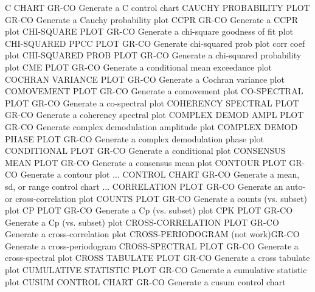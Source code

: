 C CHART                     GR-CO Generate a C control chart
CAUCHY PROBABILITY PLOT     GR-CO Generate a Cauchy probability plot
CCPR                        GR-CO Generate a CCPR plot 
CHI-SQUARE PLOT             GR-CO Generate a chi-square goodness of fit plot
CHI-SQUARED PPCC PLOT       GR-CO Generate chi-squared prob plot corr coef plot
CHI-SQUARED PROB PLOT       GR-CO Generate a chi-squared probability plot
CME PLOT                    GR-CO Generate a conditional mean exceedance plot
COCHRAN VARIANCE PLOT       GR-CO Generate a Cochran variance plot
COMOVEMENT PLOT             GR-CO Generate a comovement plot
CO-SPECTRAL PLOT            GR-CO Generate a co-spectral plot
COHERENCY SPECTRAL PLOT     GR-CO Generate a coherency spectral plot
COMPLEX DEMOD AMPL PLOT     GR-CO Generate complex demodulation amplitude plot
COMPLEX DEMOD PHASE PLOT    GR-CO Generate a complex demodulation phase plot
CONDITIONAL PLOT            GR-CO Generate a conditional plot
CONSENSUS MEAN PLOT         GR-CO Generate a consensus mean plot
CONTOUR PLOT                GR-CO Generate a contour plot
... CONTROL CHART           GR-CO Generate a mean, sd, or range control chart
... CORRELATION PLOT        GR-CO Generate an auto- or cross-correlation plot
COUNTS PLOT                 GR-CO Generate a counts (vs. subset) plot
CP PLOT                     GR-CO Generate a Cp (vs. subset) plot
CPK PLOT                    GR-CO Generate a Cp (vs. subset) plot
CROSS-CORRELATION PLOT      GR-CO Generate a cross-correlation plot
CROSS-PERIODOGRAM (not work)GR-CO Generate a cross-periodogram
CROSS-SPECTRAL PLOT         GR-CO Generate a cross-spectral plot
CROSS TABULATE PLOT         GR-CO Generate a cross tabulate plot
CUMULATIVE STATISTIC PLOT   GR-CO Generate a cumulative statistic plot
CUSUM CONTROL CHART         GR-CO Generate a cusum control chart

